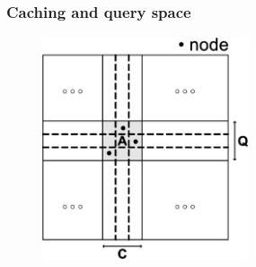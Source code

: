 \documentclass[red]{beamer}
\begin{document}
\begin{frame}
\frametitle{Caching and query space}
\begin{figure}
\centering
\includegraphics[width=2.4in]{figs/space}
\end{figure}
\end{frame}
\end{document}
